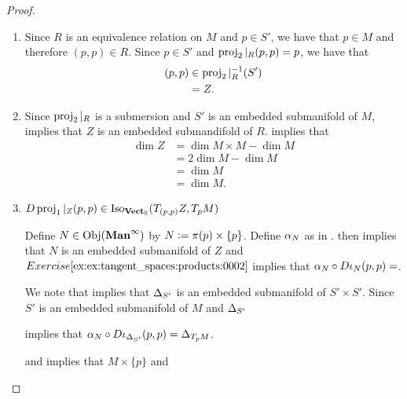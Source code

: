 \documentclass{book}
\begin{document}
	\begin{proof}\
		\begin{enumerate}
			\item Since $R$ is an equivalence relation on $M$ and $p \in S'$, we have that $p \in M$ and therefore $(p,p) \in R$. Since $p \in S'$ and $\operatorname{\text{proj}}_2|_R(p,p) = p$, we have that
			\begin{align*}
				(p,p) 
				& \in \operatorname{\text{proj}}_2|_R^{-1}(S') \\
				& = Z.
			\end{align*}
			\item Since $\operatorname{\text{proj}}_2|_R$ is a submersion and $S'$ is an embedded submanifold of $M$,  implies that $Z$ is an embedded submandifold of $R$. \rex{}  implies that
			\begin{align*}
				\dim Z 
				& = \dim M \times M - \dim M \\
				& = 2 \dim M - \dim M \\
				& = \dim M \\
				& = \dim M.
			\end{align*}
			\item $D\operatorname{\text{proj}}_1|_Z(p,p) \in \operatorname{Iso}_{\operatorname*{\text{\textbf{Vect}}_{\mathbb{R}}}}(T_{(p,p)}Z, T_pM)$
			
			Define $N \in \operatorname{Obj}(\operatorname*{\text{\textbf{Man}}^{\infty}})$ by $N \vcentcolon= \pi(p) \times \{p\}$. Define $\alpha_N$ as in .  then implies that $N$ is an embedded submanifold of $Z$ and $\rex{ex:tangent_spaces:products:0002}$ implies that $\alpha_N \circ D \iota_N(p,p) = $. 
			
			We note that  implies that $\Delta_{S'}$ is an embedded submanifold of $S' \times S'$. Since $S'$ is an embedded submanifold of $M$ and $\Delta_{S'}$
			
			 implies that $\alpha_N \circ D \iota_{\Delta_{S'}}(p,p) = \Delta_{T_pM}$.
			
			
			and   implies that $M \times \{p\}$ and 
			 \tcr{FINISH!!!} 
			
		\end{enumerate}
	\end{proof}
\end{document}
